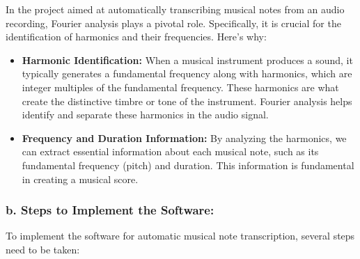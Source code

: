 \documentclass[11pt]{article}
\begin{document}
In the project aimed at automatically transcribing musical notes from an
audio recording, Fourier analysis plays a pivotal role. Specifically, it
is crucial for the identification of harmonics and their frequencies.
Here's why:

\begin{itemize}
\item
  \textbf{Harmonic Identification:} When a musical instrument produces a
  sound, it typically generates a fundamental frequency along with
  harmonics, which are integer multiples of the fundamental frequency.
  These harmonics are what create the distinctive timbre or tone of the
  instrument. Fourier analysis helps identify and separate these
  harmonics in the audio signal.
\item
  \textbf{Frequency and Duration Information:} By analyzing the
  harmonics, we can extract essential information about each musical
  note, such as its fundamental frequency (pitch) and duration. This
  information is fundamental in creating a musical score.
\end{itemize}

\hypertarget{b.-steps-to-implement-the-software}{%
\subsubsection{b. Steps to Implement the
Software:}\label{b.-steps-to-implement-the-software}}

To implement the software for automatic musical note transcription,
several steps need to be taken:
\end{document}
